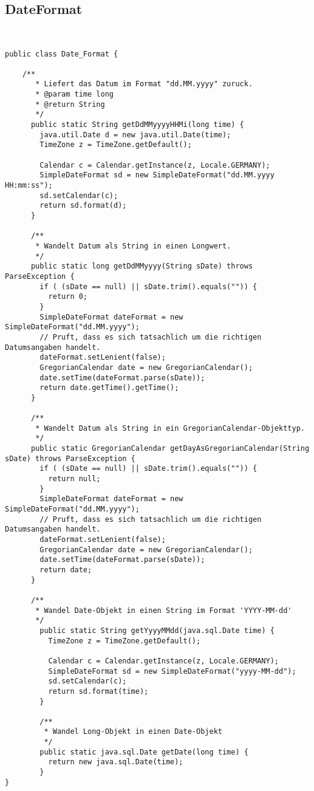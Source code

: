 \subsection{DateFormat}

\begin{lstlisting}


public class Date_Format {

	/**
	   * Liefert das Datum im Format "dd.MM.yyyy" zuruck.
	   * @param time long
	   * @return String
	   */
	  public static String getDdMMyyyyHHMi(long time) {
	    java.util.Date d = new java.util.Date(time);
	    TimeZone z = TimeZone.getDefault();

	    Calendar c = Calendar.getInstance(z, Locale.GERMANY);
	    SimpleDateFormat sd = new SimpleDateFormat("dd.MM.yyyy HH:mm:ss");
	    sd.setCalendar(c);
	    return sd.format(d);
	  }

	  /**
	   * Wandelt Datum als String in einen Longwert.
	   */
	  public static long getDdMMyyyy(String sDate) throws ParseException {
	    if ( (sDate == null) || sDate.trim().equals("")) {
	      return 0;
	    }
	    SimpleDateFormat dateFormat = new SimpleDateFormat("dd.MM.yyyy");
	    // Pruft, dass es sich tatsachlich um die richtigen Datumsangaben handelt.
	    dateFormat.setLenient(false);
	    GregorianCalendar date = new GregorianCalendar();
	    date.setTime(dateFormat.parse(sDate));
	    return date.getTime().getTime();
	  }

	  /**
	   * Wandelt Datum als String in ein GregorianCalendar-Objekttyp.
	   */
	  public static GregorianCalendar getDayAsGregorianCalendar(String sDate) throws ParseException {
	    if ( (sDate == null) || sDate.trim().equals("")) {
	      return null;
	    }
	    SimpleDateFormat dateFormat = new SimpleDateFormat("dd.MM.yyyy");
	    // Pruft, dass es sich tatsachlich um die richtigen Datumsangaben handelt.
	    dateFormat.setLenient(false);
	    GregorianCalendar date = new GregorianCalendar();
	    date.setTime(dateFormat.parse(sDate));
	    return date;
	  }

	  /**
	   * Wandel Date-Objekt in einen String im Format 'YYYY-MM-dd'
	   */
	    public static String getYyyyMMdd(java.sql.Date time) {
	      TimeZone z = TimeZone.getDefault();

	      Calendar c = Calendar.getInstance(z, Locale.GERMANY);
	      SimpleDateFormat sd = new SimpleDateFormat("yyyy-MM-dd");
	      sd.setCalendar(c);
	      return sd.format(time);
	    }

	    /**
	     * Wandel Long-Objekt in einen Date-Objekt
	     */
	    public static java.sql.Date getDate(long time) {
	      return new java.sql.Date(time);
	    }
}


\end{lstlisting}


